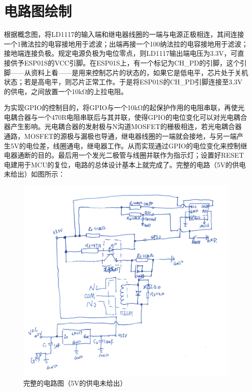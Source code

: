 \section{电路图绘制}

\setlength\parindent{2em} 根据概念图，将LD1117的输入端和继电器线圈的一端与电源正极相连，其间连接一个1微法拉的电容接地用于滤波；出端再接一个100纳法拉的电容接地用于滤波；接地端连接负极。规定电源负极为电位零点，则LD1117输出端电压为3.3V，可直接供予ESP01S的VCC引脚。在ESP01S上，有一个标记为CH\_PD的引脚，这个引脚——从资料上看——是用来控制芯片的状态的，如果它是低电平，芯片处于关机状态；若是高电平，则芯片正常工作。于是将ESP01S的CH\_PD引脚连接至3.3V的供电，之间放置一个10kΩ的上拉电阻。
\par 为实现GPIO的控制目的，将GPIO与一个10kΩ的起保护作用的电阻串联，再使光电耦合器与一个470R电阻串联后与其并联，使得GPIO的电位变化可以对光电耦合器产生影响。光电耦合器的发射极与N沟道MOSFET的栅极相连，若光电耦合器通路，MOSFET的源极与漏极也导通，继电器线圈的一端就会接地，与另一端产生5V的电位差，线圈通电，继电器工作。从而实现通过GPIO的电位变化来控制继电器通断的目的。最后用一个发光二极管与线圈并联作为指示灯；设置好RESET电建用于MCU的复位，电路的总体设计基本上就完成了。完整的电路（5V的供电未给出）如图所示：

\begin{figure}[h!]
	\includegraphics[width=\textwidth]{circuit}
	\caption[circuit]{完整的电路图（5V的供电未给出）}
\end{figure}

